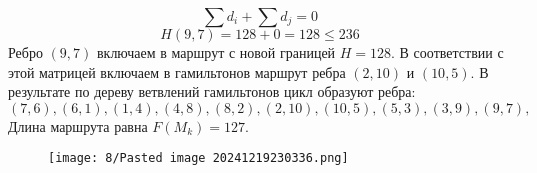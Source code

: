 \documentclass[17pt]{extarticle}
\begin{document}
\[ \sum d_i + \sum d_j = 0 \]
\[ H(9,7) = 128 + 0 = 128 \leq 236 \]
Ребро \((9,7)\) включаем в маршрут с новой границей \( H = 128 \).
В соответствии с этой матрицей включаем в гамильтонов маршрут ребра \((2,10)\) и \((10,5)\).
В результате по дереву ветвлений гамильтонов цикл образуют ребра:
\[ (7,6), (6,1), (1,4), (4,8), (8,2), (2,10), (10,5), (5,3), (3,9), (9,7), \]
Длина маршрута равна \( F(M_k) = 127 \).
\begin{figure}[H]
    \centering
    \texttt{[image: 8/Pasted image 20241219230336.png]}
\end{figure}
\end{document}
